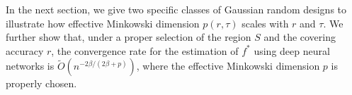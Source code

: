 In the next section, we give two specific classes of Gaussian random designs to illustrate how effective Minkowski dimension $p(r,\tau)$ scales with $r$ and $\tau$. We further show that, under a proper selection of the region $S$ and the covering accuracy $r$, the convergence rate for the estimation of $f^*$ using deep neural networks is $\tilde{O}(n^{-2\beta/(2\beta+p)})$, where the effective Minkowski dimension $p$ is properly chosen. 
